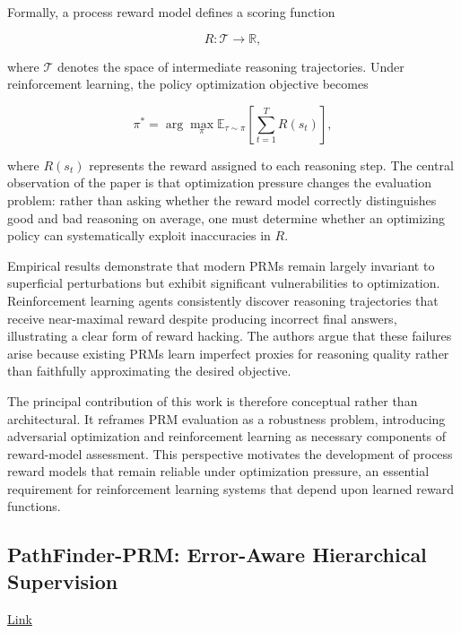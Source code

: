 \documentclass[11pt]{article}
\begin{document}
Formally, a process reward model defines a scoring function

\[
R : \mathcal{T} \rightarrow \mathbb{R},
\]

where $\mathcal{T}$ denotes the space of intermediate reasoning trajectories. Under reinforcement learning, the policy optimization objective becomes

\[
\pi^*
=
\arg\max_\pi
\mathbb{E}_{\tau\sim\pi}
\left[
\sum_{t=1}^{T}
R(s_t)
\right],
\]

where $R(s_t)$ represents the reward assigned to each reasoning step. The central observation of the paper is that optimization pressure changes the evaluation problem: rather than asking whether the reward model correctly distinguishes good and bad reasoning on average, one must determine whether an optimizing policy can systematically exploit inaccuracies in $R$.

Empirical results demonstrate that modern PRMs remain largely invariant to superficial perturbations but exhibit significant vulnerabilities to optimization. Reinforcement learning agents consistently discover reasoning trajectories that receive near-maximal reward despite producing incorrect final answers, illustrating a clear form of reward hacking. The authors argue that these failures arise because existing PRMs learn imperfect proxies for reasoning quality rather than faithfully approximating the desired objective.

The principal contribution of this work is therefore conceptual rather than architectural. It reframes PRM evaluation as a robustness problem, introducing adversarial optimization and reinforcement learning as necessary components of reward-model assessment. This perspective motivates the development of process reward models that remain reliable under optimization pressure, an essential requirement for reinforcement learning systems that depend upon learned reward functions.

\subsection{PathFinder-PRM: Error-Aware Hierarchical Supervision}

\href{https://arxiv.org/abs/2505.19706}{Link}
\end{document}
